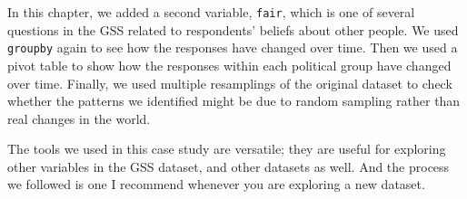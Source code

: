 In this chapter, we added a second variable,
\passthrough{\lstinline!fair!}, which is one of several questions in the
GSS related to respondents' beliefs about other people. We used
\passthrough{\lstinline!groupby!} again to see how the responses have
changed over time. Then we used a pivot table to show how the responses
within each political group have changed over time. Finally, we used
multiple resamplings of the original dataset to check whether the
patterns we identified might be due to random sampling rather than real
changes in the world.

The tools we used in this case study are versatile; they are useful for
exploring other variables in the GSS dataset, and other datasets as
well. And the process we followed is one I recommend whenever you are
exploring a new dataset.

